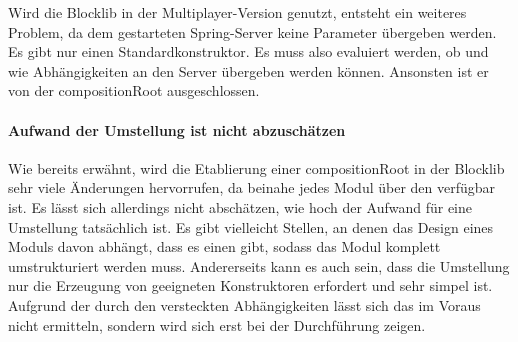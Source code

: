 Wird die Blocklib in der Multiplayer-Version genutzt, entsteht ein weiteres Problem, da dem gestarteten Spring-Server keine Parameter übergeben werden. Es gibt nur einen Standardkonstruktor. Es muss also evaluiert werden, ob und wie Abhängigkeiten an den Server übergeben werden können. Ansonsten ist er von der \gls{compositionRoot} ausgeschlossen.

\paragraph{Aufwand der Umstellung ist nicht abzuschätzen}
Wie bereits erwähnt, wird die Etablierung einer \gls{compositionRoot} in der Blocklib sehr viele Änderungen hervorrufen, da beinahe jedes Modul über den \classContext{} verfügbar ist. Es lässt sich allerdings nicht abschätzen, wie hoch der Aufwand für eine Umstellung tatsächlich ist. Es gibt vielleicht Stellen, an denen das Design eines Moduls davon abhängt, dass es einen \classContext{} gibt, sodass das Modul komplett umstrukturiert werden muss. Andererseits kann es auch sein, dass die Umstellung nur die Erzeugung von geeigneten Konstruktoren erfordert und sehr simpel ist. Aufgrund der durch den \classContext{} versteckten Abhängigkeiten lässt sich das im Voraus nicht ermitteln, sondern wird sich erst bei der Durchführung zeigen.
